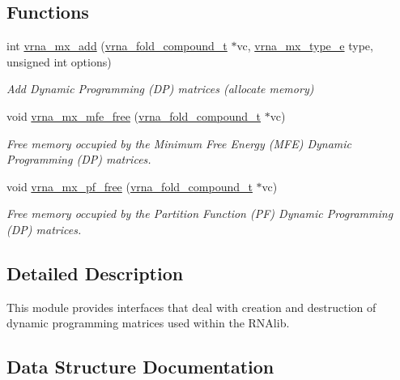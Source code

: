 \subsection*{Functions}
\begin{DoxyCompactItemize}
\item 
int \hyperlink{group__dp__matrices_ga08661f098008961dab0023bf300f0c33}{vrna\-\_\-mx\-\_\-add} (\hyperlink{group__fold__compound_ga1b0cef17fd40466cef5968eaeeff6166}{vrna\-\_\-fold\-\_\-compound\-\_\-t} $\ast$vc, \hyperlink{group__dp__matrices_ga6042ea1d58d01931e959791be6d89343}{vrna\-\_\-mx\-\_\-type\-\_\-e} type, unsigned int options)
\begin{DoxyCompactList}\small\item\em Add Dynamic Programming (D\-P) matrices (allocate memory) \end{DoxyCompactList}\item 
void \hyperlink{group__dp__matrices_ga6a9422feb5dfe5c64050cebf447672d0}{vrna\-\_\-mx\-\_\-mfe\-\_\-free} (\hyperlink{group__fold__compound_ga1b0cef17fd40466cef5968eaeeff6166}{vrna\-\_\-fold\-\_\-compound\-\_\-t} $\ast$vc)
\begin{DoxyCompactList}\small\item\em Free memory occupied by the Minimum Free Energy (M\-F\-E) Dynamic Programming (D\-P) matrices. \end{DoxyCompactList}\item 
void \hyperlink{group__dp__matrices_ga2283e69fd139fb8e58d7ade3b5773f9c}{vrna\-\_\-mx\-\_\-pf\-\_\-free} (\hyperlink{group__fold__compound_ga1b0cef17fd40466cef5968eaeeff6166}{vrna\-\_\-fold\-\_\-compound\-\_\-t} $\ast$vc)
\begin{DoxyCompactList}\small\item\em Free memory occupied by the Partition Function (P\-F) Dynamic Programming (D\-P) matrices. \end{DoxyCompactList}\end{DoxyCompactItemize}


\subsection{Detailed Description}
This module provides interfaces that deal with creation and destruction of dynamic programming matrices used within the R\-N\-Alib. 

\subsection{Data Structure Documentation}
\label{structvrna__mx__mfe__s}
\hypertarget{group__dp__matrices_structvrna__mx__mfe__s}{}
